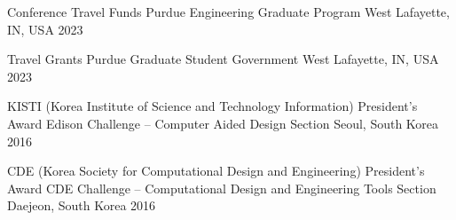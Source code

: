 

\begin{cvhonors}

\cvhonor
{Conference Travel Funds} %
{Purdue Engineering Graduate Program} %
{West Lafayette, IN, USA} %
{2023} %

\cvhonor
{Travel Grants} %
{Purdue Graduate Student Government} %
{West Lafayette, IN, USA} %
{2023} %

\cvhonor
{KISTI (Korea Institute of Science and Technology Information) President’s Award} %
{Edison Challenge –  Computer Aided Design Section} %
{Seoul, South Korea} %
{2016} %


\cvhonor
{CDE (Korea Society for Computational Design and Engineering) President’s Award} %
{CDE Challenge – Computational Design and Engineering Tools Section} %
{Daejeon, South Korea} %
{2016} %


\end{cvhonors}
